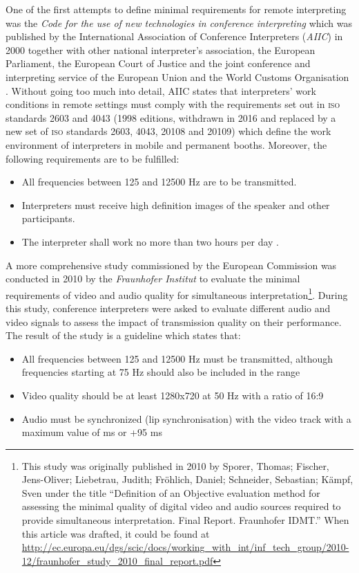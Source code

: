 \documentclass[output=paper]{langsci/langscibook}
\begin{document}
One of the first attempts to define minimal requirements for remote interpreting was the \textit{Code for the use of new technologies in conference interpreting} which was published by the International Association of Conference Interpreters (\textit{AIIC}) in 2000 together with other national interpreter’s association, the European Parliament, the European Court of Justice and the joint conference and interpreting service of the European Union and the World Customs Organisation \citep[31]{Korak2010}. Without going too much into detail, AIIC states that interpreters’ work conditions in remote settings must comply with the requirements set out in \textsc{iso} standards 2603 and 4043 (1998 editions, withdrawn in 2016 and replaced by a new set of \textsc{iso} standards 2603, 4043, 20108 and 20109) which define the work environment of interpreters in mobile and permanent booths. Moreover, the following requirements are to be fulfilled:

\begin{itemize}
\item All frequencies between 125 and 12500 Hz are to be transmitted.
\item Interpreters must receive high definition images of the speaker and other participants. 
\item The interpreter shall work no more than two hours per day \citep[2]{AIIC2000}.
\end{itemize}

A more comprehensive study commissioned by the European Commission was conducted in 2010 by the \textit{Fraunhofer Institut} to evaluate the minimal requirements of video and audio quality for simultaneous interpretation\footnote{This study was originally published in 2010 by Sporer, Thomas; Fischer, Jens-Oliver; Liebetrau, Judith; Fröhlich, Daniel; Schneider, Sebastian; Kämpf, Sven under the title “Definition of an Objective evaluation method for assessing the minimal quality of digital video and audio sources required to provide simultaneous interpretation. Final Report. Fraunhofer IDMT.” When this article was drafted, it could be found at \url{http://ec.europa.eu/dgs/scic/docs/working_with_int/inf_tech_group/2010-12/fraunhofer_study_2010_final_report.pdf}}. During this study, conference interpreters were asked to evaluate different audio and video signals to assess the impact of transmission quality on their performance. The result of the study is a guideline which states that:

\begin{itemize}
\item All frequencies between 125 and 12500 Hz must be transmitted, although frequencies starting at 75 Hz should also be included in the range
\item Video quality should be at least 1280x720 at 50 Hz with a ratio of 16:9
\item Audio must be synchronized (lip synchronisation) with the video track with a maximum value of  ms or +95 ms
\end{itemize}
\end{document}
